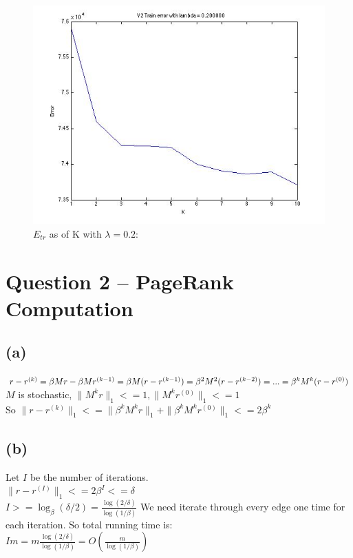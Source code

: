 \documentclass{article}
\begin{document}
\begin{figure}[H]
\centering
\includegraphics[scale=0.5]{TrainErrorLambda02-V2.jpg}
\caption{ $E_{tr}$ as of K with $\lambda=0.2$:}
\label{}
\end{figure}


\section{Question 2 -- PageRank Computation}
\subsection{(a)}
$r - r^{(k)} = \beta Mr - \beta Mr^{(k-1)} \\
=\beta M(r - r^{(k-1)}) \\
=\beta^2M^2(r - r^{(k-2)}) \\
=... \\
=\beta^kM^k(r - r^{(0)})$ \\
$M$ is stochastic, $\|M^kr\|_1 <= 1, \|M^kr^{(0)}\|_1 <= 1$ \\
So $\|r - r^{(k)}\|_1 <= \|\beta^k M^kr\|_1 + \|\beta^k M^kr^{(0)}\|_1 <= 2\beta^k$

\subsection{(b)}
Let $I$ be the number of iterations. \\
$\|r - r^{(I)}\|_1<= 2\beta^I <= \delta$\\
$I >= \log_\beta (\delta/2) = \frac{\log (2/\delta)}{\log (1/\beta)}$
We need iterate through every edge one time for each iteration. So total running time is: \\
$Im = m \frac{\log (2/\delta)}{\log (1/\beta)} = O({\frac{m}{\log (1/\beta)}})$
\end{document}
